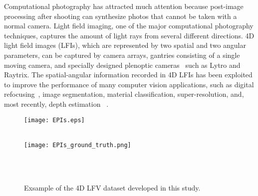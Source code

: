\documentclass[]{spie}
\newcommand{\jtextd}[1]{}
\begin{document}
Computational photography has attracted much attention
because post-image processing after shooting can synthesize photos
that cannot be taken with a normal camera.
Light field imaging, one of the major
computational photography techniques,  captures the amount of light
rays from several different directions.
4D light field images (LFIs), which are represented by two spatial and two angular parameters, 
can be captured by camera arrays, 
gantries consisting of a single moving camera, and 
specially designed plenoptic cameras~\cite{ng2005light} such as Lytro and Raytrix.
The spatial-angular information recorded in 4D LFIs
has been exploited to improve the performance of many computer
vision applications, such as digital refocusing~\cite{ng2005light},
image segmentation,
material classification,
super-resolution,
and, most recently, depth estimation
~\cite{tao2013depth,shin2018epinet,faluvegi20193d}.

\begin{figure}[tbp]
  \vspace{-1.8em}
   \centering
   \begin{minipage}{0.49\hsize}
      \centering
      \texttt{[image: EPIs.eps]}\\
      ~\\
      \label{fig:EPIs}
\end{minipage}
   \hfill
   \begin{minipage}{0.49\hsize}
      \centering
      \texttt{[image: EPIs\_ground\_truth.png]}\\
      \label{fig:disparity}
   \end{minipage}
   ~\\~\\
   \caption{Exsample of the 4D LFV dataset developed in this study.}
   \label{fig:EPIs_disparity}
\end{figure}

\jtextd{
   4D LFIsを用いた奥行き推定は，ここ数年，活発に研究されている．
   プレノプティックカメラの構造上，サブアパーチャー画像間のベースラインが非常に狭く，
空間分解能と角度分解能の間にトレードオフがある．
   このことが，
   プレノプティックカメラにより撮影された4D LFIsからの
   奥行き推定を困難にしている．
近年，角度-空間方向の二次元スライスからなるエピポーラ平面画像（Epipolar Plane Images: EPIs）
   （図~\ref{fig:EPIs}）を用いた深層学習ベースの手法
   ~\cite{shin2018epinet,leistner2019learning,faluvegi20193d}が，
   4D LFIs奥行き推定手法を評価するためのベンチマークとしてよく使用される
   HCI 4D Light Field Benchmark\footnote{https://lightfield-analysis.uni-konstanz.de/}
   ~\cite{honauer2016benchmark}の精度指標でトップランクを獲得している．
しかし，従来研究では静的な4D LFIsを用いた奥行き推定に焦点を当てており，
   4Dライトフィールド映像（Light Field Videos: LFVs）のような時間情報を
   考慮した奥行き推定は行われていない．
単眼奥行き推定においては，連続した映像フレーム間の時間的相関と一貫性を考慮することで
   性能が向上することが示されており~\cite{zhang2019exploiting}，
時間情報が4D LF奥行き推定にも役立つことを示唆している．
}
\end{document}
